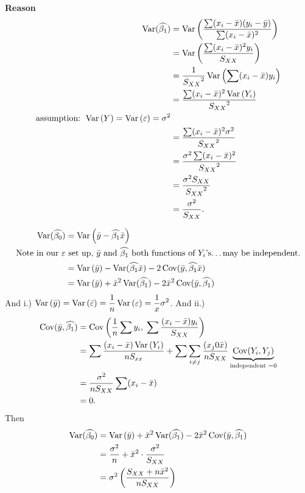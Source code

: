 \nl \textbf{Reason} 
\begin{align*}
    \Var*{\widehat{\beta_1}} &= \Var{\dfrac{\sum(x_i-\bar{x})(y_i - \bar{y})}{\sum(x_i-\bar{x})^2}}\\
    &= \Var{\dfrac{\sum(x_i-\bar x)^2y_i}{S_{XX}}}\\
    &= \over{{S_{XX}}^2} \Var{\sum (x_i-\bar x)y_i}\\
    &= \frac{\sum (x_i - \bar x)^2 \Var{Y_i}}{{S_{XX}}^2}
    \\ \text{assumption: } \Var{Y} = \Var{\varepsilon} = \sigma^2\\
    &= \frac{\sum (x_i - \bar x)^2 \sigma^2}{{S_{XX}}^2}\\
    &= \frac{\sigma^2 \sum(x_i - \bar x)^2}{{S_{XX}}^2}\\
    &= \frac{\sigma^2 S_{XX}}{{S_{XX}}^2} \\
    &= \frac{\sigma^2}{S_{XX}}.
\end{align*}

\begin{align*}
    \Var*{\widehat{\beta_0}} &= \Var{\bar y - \widehat{\beta_1} \bar x}\\
    \text{Note in our } \varepsilon & \text{ set up, } \bar y \text{ and } \widehat{\beta_1} \text{ both functions of } Y_i\text{'s\dots may be independent.}
    \\ &= \Var {\bar y} - \Var*{\widehat{\beta_1} \bar x} - 2 \Cov (\bar y, \widehat{\beta_1}\bar x)\\
    &= \Var{\bar y} + \bar x^2 \Var*{\widehat{\beta_1}} - 2\bar x^2 \Cov (\bar y, \widehat{\beta_1})
\end{align*}
And i.) $\displaystyle \Var{\bar y} = \Var{\bar{\varepsilon}} = \over{n} \Var{\varepsilon} = \over{x} \sigma^2$.
And ii.)
\begin{align*}
    \Cov (\bar y, \widehat{\beta_1}) &= \Cov \pars{\over{n}\sum y_i,\; \sum \frac{(x_i - \bar x)y_i}{S_{XX}}}\\
    &= \sum \frac{(x_i - \bar x) \Var{Y_i}}{nS_{xx}} + \sum \sum_{i \neq j} \frac{(x_j 0 \bar x)}{n S_{XX}} \underbrace{\Cov (Y_i, Y_j)}_{\text{independent } = 0}\\
    &= \frac{\sigma^2}{n S_{XX}} \sum (x_i - \bar x)\\
    &= 0.
\end{align*}
Then 
\begin{align*}
    \Var*{\widehat{\beta_0}} &= \Var{\bar y} + \bar x^2  \Var*{\widehat{\beta_1}} - 2 \bar x^2 \Cov (\bar y, \widehat{\beta_1})\\
    &= \frac{\sigma^2}{n} + \bar x^2 \cdot \frac{\sigma^2}{S_{XX}}\\
    &= \sigma^2 \pfrac{S_{XX}+n \bar x^2}{nS_{XX}}
\end{align*}

